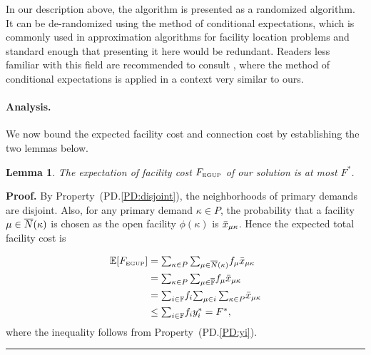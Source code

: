 \documentclass[oneside,final]{ucr}
\newtheorem{lemma}[theorem]{Lemma}
\newenvironment{proof}[1][Proof]{\textbf{#1.} }{\ \rule{0.5em}{0.5em}}
\def\dsp{\def\baselinestretch{2.0}\large\normalsize}
\def\ssp{\def\baselinestretch{1.0}\large\normalsize}
\begin{document}
In our description above, the algorithm is presented as a
randomized algorithm. It can be de-randomized using the
method of conditional expectations, which is commonly used
in approximation algorithms for facility location problems
and standard enough that presenting it here would be
redundant. Readers less familiar with this field are
recommended to consult \cite{ChudakS04}, where the method of
conditional expectations is applied in a context very
similar to ours.


\paragraph{Analysis.}
We now bound the expected facility cost and connection cost
by establishing the two lemmas below.


\begin{lemma}\label{lemma:3fac}
The expectation of facility cost $F_{\mbox{\tiny\rm EGUP}}$ of our solution is
  at most $F^\ast$.
\end{lemma}
\begin{proof}
  By Property~(PD.\ref{PD:disjoint}), the neighborhoods of
  primary demands are disjoint. Also, for any primary demand
  $\kappa\in P$, the probability that a facility
  $\mu\in{\overline{N}}(\kappa)$ is chosen as the open facility
  $\phi(\kappa)$ is ${\bar x}_{\mu\kappa}$. Hence the expected
  total facility cost is

\ssp
\begin{align*}
    \mathbb{E}[F_{\mbox{\tiny\rm EGUP}}]
	&= \textstyle{\sum_{\kappa\in P}\sum_{\mu\in{\overline{N}}(\kappa)}} f_{\mu} {\bar x}_{\mu\kappa}
	\\
	&= \textstyle{\sum_{\kappa\in P}\sum_{\mu\in\overline{\mathbb{F}}}} f_{\mu} {\bar x}_{\mu\kappa} 
	\\
	&= \textstyle{\sum_{i\in\mathbb{F}}} f_i \textstyle{\sum_{\mu\in i}\sum_{\kappa\in P}} {\bar x}_{\mu\kappa} 
	\\
	&\leq \textstyle{\sum_{i\in\mathbb{F}}} f_i y_i^\ast 
	= F^\ast,
\end{align*}
\dsp
where the inequality follows from Property~(PD.\ref{PD:yi}).
\end{proof}

\end{document}
